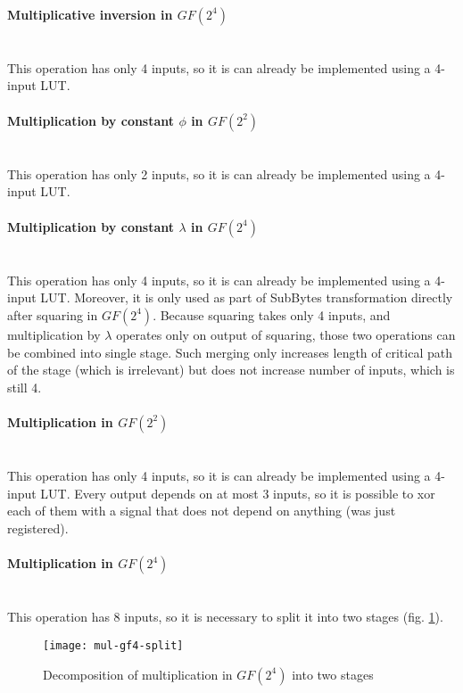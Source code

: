 \paragraph{Multiplicative inversion in $GF(2^4)$}\mbox{}\\
This operation has only 4 inputs, so it is can already be implemented using a 4-input LUT.

\paragraph{Multiplication by constant $\phi$ in $GF(2^2)$}\mbox{}\\
This operation has only 2 inputs, so it is can already be implemented using a 4-input LUT. 

\paragraph{Multiplication by constant $\lambda$ in $GF(2^4)$}\mbox{}\\
This operation has only 4 inputs, so it is can already be implemented using a 4-input LUT. Moreover, it is only used as part of SubBytes transformation directly after squaring in $GF(2^4)$. Because squaring takes only 4 inputs, and multiplication by $\lambda$ operates only on output of squaring, those two operations can be combined into single stage. Such merging only increases length of critical path of the stage (which is irrelevant) but does not increase number of inputs, which is still 4.


\paragraph{Multiplication in $GF(2^2)$}\mbox{}\\
This operation has only 4 inputs, so it is can already be implemented using a 4-input LUT. Every output depends on at most 3 inputs, so it is possible to xor each of them with a signal that does not depend on anything (was just registered).

\paragraph{Multiplication in $GF(2^4)$}\mbox{}\\
This operation has 8 inputs, so it is necessary to split it into two stages (fig. \ref{fig:mul-gf4-split}).

\begin{figure}[!h]
\centering
\texttt{[image: mul-gf4-split]}
\caption{Decomposition of multiplication in $GF(2^4)$ into two stages}
\label{fig:mul-gf4-split}
\end{figure}

